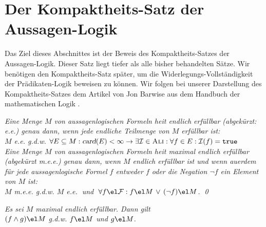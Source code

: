 \section{Der Kompaktheits-Satz der Aussagen-Logik}
Das Ziel dieses Abschnittes ist der Beweis des Kompaktheits-Satzes der Aussagen-Logik.  
Dieser Satz liegt tiefer als alle bisher behandelten S\"{a}tze.  Wir ben\"{o}tigen den Kompaktheits-Satz
sp\"{a}ter, um die Widerlegungs-Vollst\"{a}ndigkeit der Pr\"{a}dikaten-Logik beweisen zu k\"{o}nnen.
Wir folgen bei unserer Darstellung des Kompaktheits-Satzes dem Artikel von Jon Barwise
\cite{barwise:1991a} aus dem Handbuch der mathematischen Logik \cite{barwise:1991}.

\begin{Definition}
  {\em Eine Menge $M$ von aussagenlogischen Formeln hei\3t \emph{endlich erf\"{u}llbar} (abgek\"{u}rzt: e.e.) genau
    dann, wenn jede endliche Teilmenge von $M$ erf\"{u}llbar ist:
    \\[0.2cm]
    \hspace*{1.3cm} 
    $M$ e.e. \quad g.d.w. \quad 
    $\forall E \subseteq M: \textsl{card}(E) < \infty \rightarrow 
    \exists \mathcal{I} \in \textsc{Ali}: \forall f \in E: \mathcal{I}(f) = \mathtt{true}$
    \\[0.2cm]
    Eine Menge $M$ von aussagenlogischen Formeln hei\3t \emph{maximal endlich erf\"{u}llbar}
    (abgek\"{u}rzt m.e.e.) genau dann, wenn $M$ endlich erf\"{u}llbar ist und wenn au\3erdem f\"{u}r
    jede aussagenlogische Formel $f$ entweder $f$ oder die Negation $\neg f$ ein Element von $M$ ist:
    \\[0.2cm]
    \hspace*{1.3cm}
    $M$ m.e.e. \quad g.d.w. \quad 
    $M$ e.e.$\;$ und $\;\forall f \el \mathcal{F}: f \el M \,\vee\, (\neg f) \el M$. \qed
  }
\end{Definition}

\begin{Satz} \label{satz28}
{\em
  Es sei $M$ maximal endlich erf\"{u}llbar.  Dann gilt 
  \\[0.2cm]
  \hspace*{1.3cm}
  $(f \wedge g) \el M$ \quad g.d.w. \quad $f \el M$ und $g \el M$.
}
\end{Satz}

